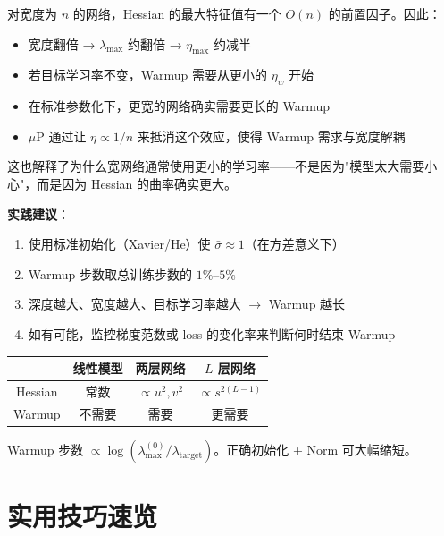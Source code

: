 \documentclass[12pt, a4paper]{ctexart}
\begin{document}
\begin{keypoint}[宽度增大曲率]
对宽度为 $n$ 的网络，Hessian 的最大特征值有一个 $O(n)$ 的前置因子。因此：
\begin{itemize}
    \item 宽度翻倍 → $\lambda_{\max}$ 约翻倍 → $\eta_{\max}$ 约减半
    \item 若目标学习率不变，Warmup 需要从更小的 $\eta_w$ 开始
    \item 在标准参数化下，更宽的网络确实需要更长的 Warmup
    \item $\mu$P 通过让 $\eta \propto 1/n$ 来抵消这个效应，使得 Warmup 需求与宽度解耦
\end{itemize}
这也解释了为什么宽网络通常使用更小的学习率——不是因为"模型太大需要小心"，而是因为 Hessian 的曲率确实更大。
\end{keypoint}

\textbf{实践建议}：
\begin{enumerate}
    \item 使用标准初始化（Xavier/He）使 $\bar{\sigma} \approx 1$（在方差意义下）
    \item Warmup 步数取总训练步数的 $1\%$--$5\%$
    \item 深度越大、宽度越大、目标学习率越大 $\to$ Warmup 越长
    \item 如有可能，监控梯度范数或 loss 的变化率来判断何时结束 Warmup
\end{enumerate}

\begin{keypoint}
\begin{center}
\begin{tabular}{c|ccc}
 & 线性模型 & 两层网络 & $L$ 层网络 \\
\hline
Hessian & 常数 & $\propto u^2,v^2$ & $\propto s^{2(L-1)}$ \\
Warmup & 不需要 & 需要 & 更需要 \\
\end{tabular}
\end{center}

Warmup 步数 $\propto \log(\lambda_{\max}^{(0)}/\lambda_{\text{target}})$。正确初始化 + Norm 可大幅缩短。
\end{keypoint}

\section{实用技巧速览}
\end{document}
